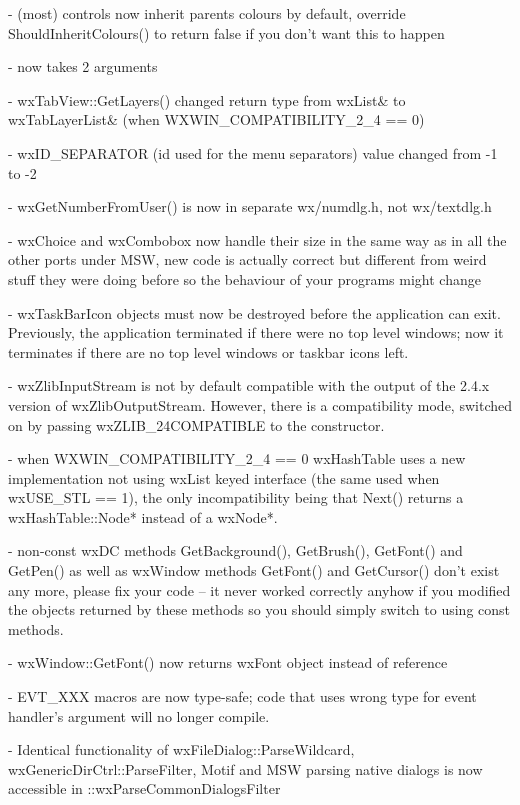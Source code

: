 - (most) controls now inherit parents colours by default, override
  ShouldInheritColours() to return false if you don't want this to happen

-  now takes 2 arguments

- wxTabView::GetLayers() changed return type from wxList& to wxTabLayerList&
  (when WXWIN\_COMPATIBILITY\_2\_4 == 0)

- wxID\_SEPARATOR (id used for the menu separators) value changed from -1 to -2

- wxGetNumberFromUser() is now in separate wx/numdlg.h, not wx/textdlg.h

- wxChoice and wxCombobox now handle their size in the same way as in all the
  other ports under MSW, new code is actually correct but different from weird
  stuff they were doing before so the behaviour of your programs might change

- wxTaskBarIcon objects must now be destroyed before the application can exit.
  Previously, the application terminated if there were no top level windows;
  now it terminates if there are no top level windows or taskbar icons left.

- wxZlibInputStream is not by default compatible with the output of the
  2.4.x version of wxZlibOutputStream. However, there is a compatibility mode,
  switched on by passing wxZLIB\_24COMPATIBLE to the constructor.

- when WXWIN\_COMPATIBILITY\_2\_4 == 0 wxHashTable uses a new implementation
  not using wxList keyed interface (the same used when wxUSE\_STL == 1),
  the only incompatibility being that Next() returns a wxHashTable::Node*
  instead of a wxNode*.

- non-const wxDC methods GetBackground(), GetBrush(), GetFont() and GetPen()
  as well as wxWindow methods GetFont() and GetCursor() don't exist any more,
  please fix your code -- it never worked correctly anyhow if you modified the
  objects returned by these methods so you should simply switch to using const
  methods.

- wxWindow::GetFont() now returns wxFont object instead of reference

- EVT\_XXX macros are now type-safe; code that uses wrong type for event
  handler's argument will no longer compile.

- Identical functionality of wxFileDialog::ParseWildcard,
  wxGenericDirCtrl::ParseFilter, Motif and MSW parsing native dialogs
  is now accessible in ::wxParseCommonDialogsFilter

